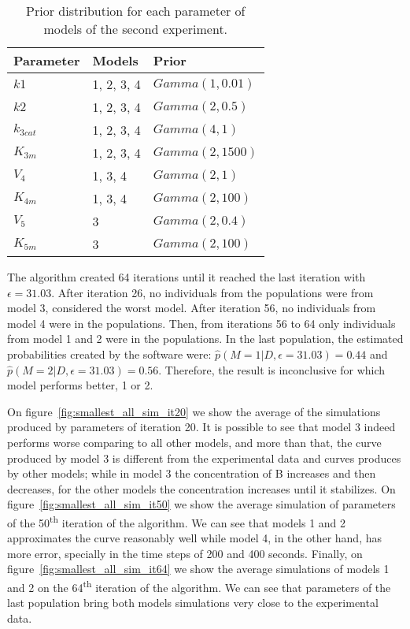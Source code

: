 \begin{table}[h]
\centering
\begin{tabular}{l l l}
Parameter   & Models     & Prior             \\ \hline
\hline
$k1$        & 1, 2, 3, 4 & $Gamma (1, 0.01)$ \\
$k2$        & 1, 2, 3, 4 & $Gamma (2, 0.5)$  \\
$k_{3cat}$  & 1, 2, 3, 4 & $Gamma (4, 1)$    \\
$K_{3m}$    & 1, 2, 3, 4 & $Gamma (2, 1500)$ \\
$V_4$       & 1, 3, 4    & $Gamma (2, 1)$    \\
$K_{4m}$    & 1, 3, 4    & $Gamma (2, 100)$  \\
$V_5$       & 3          & $Gamma (2, 0.4)$  \\
$K_{5m}$    & 3          & $Gamma (2, 100)$  \\ \hline
\end{tabular}
\caption{Prior distribution for each parameter of models of the second 
    experiment.}
\label{tab:smallest_priors}
\end{table}

The algorithm created 64 iterations until it reached the last iteration
with $\epsilon = 31.03$. After iteration 26, no individuals from the 
populations were from model 3, considered the worst model. After 
iteration 56, no individuals from model 4 were in the populations. Then,
from iterations 56 to 64 only individuals from model 1 and 2 were in 
the populations. In the last population, the estimated probabilities
created by the software were: 
$\hat{p} (M = 1 | D, \epsilon = 31.03) = 0.44$ and 
$\hat{p} (M = 2 | D, \epsilon = 31.03) = 0.56$. Therefore, the result
is inconclusive for which model performs better, 1 or 2. 

On figure~\ref{fig:smallest_all_sim_it20} we show the average of the 
simulations produced by parameters of iteration 20. It is possible to
see that model 3 indeed performs worse comparing to all other models,
and more than that, the curve produced by model 3 is different from the 
experimental data and curves produces by other models; while in model 3
the concentration of B increases and then decreases, for the other 
models the concentration increases until it stabilizes. On 
figure~\ref{fig:smallest_all_sim_it50} we show the average simulation
of parameters of the 50\textsuperscript{th} iteration of the algorithm.
We can see that models 1 and 2 approximates the curve reasonably well
while model 4, in the other hand, has more error, specially in the 
time steps of 200 and 400 seconds. Finally, on 
figure~\ref{fig:smallest_all_sim_it64} we show the average simulations 
of models 1 and 2 on the 64\textsuperscript{th} iteration of the 
algorithm. We can see that parameters of the last population bring both
models simulations very close to the experimental data.

